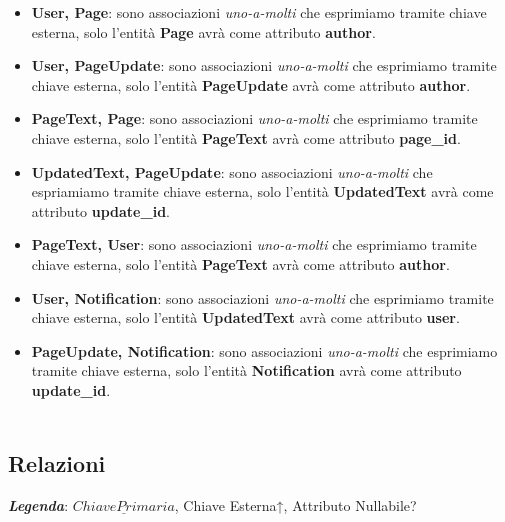 \documentclass{article}
\begin{document}
	\begin{itemize}
		\item \textbf{User, Page}: sono associazioni {\itshape{uno-a-molti}} che esprimiamo tramite chiave esterna, solo l'entit\`a \textbf{Page} avr\`a come attributo \textbf{author}.
		\item \textbf{User, PageUpdate}: sono associazioni {\itshape{uno-a-molti}} che esprimiamo tramite chiave esterna, solo l'entit\`a \textbf{PageUpdate} avr\`a come attributo \textbf{author}.
		\item \textbf{PageText, Page}: sono associazioni {\itshape{uno-a-molti}} che esprimiamo tramite chiave esterna, solo l'entit\`a \textbf{PageText} avr\`a come attributo \textbf{page\_id}.
		\item \textbf{UpdatedText, PageUpdate}: sono associazioni {\itshape{uno-a-molti}} che espriamiamo tramite chiave esterna, solo l'entit\`a \textbf{UpdatedText} avr\`a come attributo \textbf{update\_id}.
		\item \textbf{PageText, User}: sono associazioni {\itshape{uno-a-molti}} che esprimiamo tramite chiave esterna, solo l'entit\`a \textbf{PageText} avr\`a come attributo \textbf{author}.
		\item \textbf{User, Notification}: sono associazioni {\itshape{uno-a-molti}} che esprimiamo tramite chiave esterna, solo l'entit\`a \textbf{UpdatedText} avr\`a come attributo \textbf{user}.
		\item \textbf{PageUpdate, Notification}: sono associazioni {\itshape{uno-a-molti}} che esprimiamo tramite chiave esterna, solo l'entit\`a \textbf{Notification} avr\`a come attributo \textbf{update\_id}.
		\\\\
	\end{itemize}
	
	\subsection{Relazioni}
	\textbf{{\itshape{Legenda}}}: $\underline{Chiave Primaria}$, Chiave Esterna↑, Attributo Nullabile?
	
\end{document}
